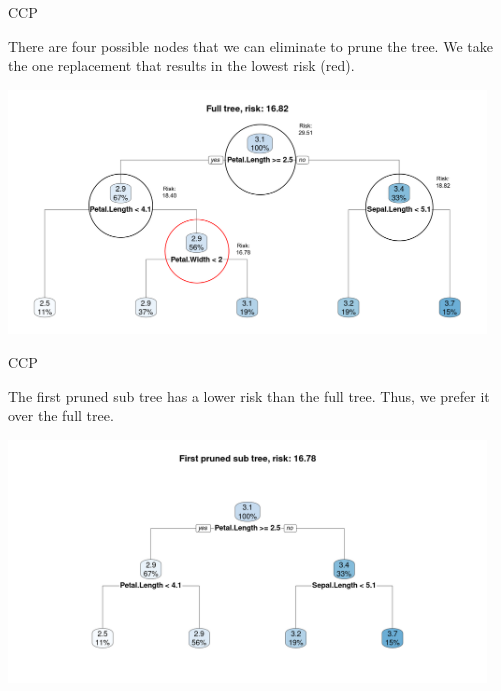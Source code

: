\documentclass[11pt,compress,t,notes=noshow, xcolor=table]{beamer}
\begin{document}
\begin{frame}[noframenumbering]{CCP}

There are four possible nodes that we can eliminate to prune the tree.
We take the one replacement that results in the lowest risk (red).

\vspace{0.25cm}

\color{fgcolor}

{\centering \includegraphics[width=0.95\textwidth]{figure/ccp_1_notes.pdf} 

}

\end{frame}

\begin{frame}[noframenumbering]{CCP}


The first pruned sub tree has a lower risk than the full tree.
Thus, we prefer it over the full tree.
\vspace{0.25cm}

{\centering \includegraphics[width=0.95\textwidth]{figure/ccp_2.pdf} 

}

\end{frame}
\end{document}
